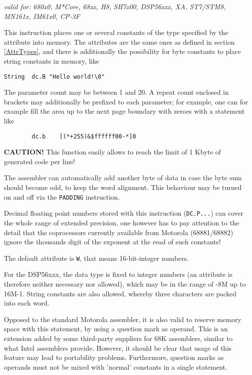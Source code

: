 \documentclass[12pt,twoside]{report}
\newcommand{\bb}[1]{{\bf #1}}
\newcommand{\tty}[1]{{\tt #1}}
\begin{document}
{\em valid for: 680x0, M*Core, 68xx, H8, SH7x00, DSP56xxx, XA,
  ST7/STM8, MN161x, IM61x0, CP-3F}

This instruction places one or several constants of the type
specified by the attribute into memory.  The attributes are the same ones as
defined in section \ref{AttrTypes}, and there is additionally the
possibility for byte constants to place string constants in memory, like
\begin{verbatim}
String  dc.B "Hello world!\0"
\end{verbatim}
The parameter count may be between 1 and 20.  A repeat count enclosed
in brackets may additionally be prefixed to each parameter; for
example, one can for example fill the area up to the next page
boundary with zeroes with a statement like
\begin{verbatim}
        dc.b    [(*+255)&$ffffff00-*]0
\end{verbatim}
\bb{CAUTION!}  This function easily allows to reach the limit of 1 Kbyte
of generated code per line!

The assembler can automatically add another byte of data in case the byte sum
should become odd, to keep the word alignment.  This behaviour may be
turned on and off via the \tty{PADDING} instruction.

Decimal floating point numbers stored with this instruction (\tty{DC.P...})
can cover the whole range of extended precision, one however has to
pay attention to the detail that the coprocessors currently available
from Motorola (68881/68882) ignore the thousands digit of the
exponent at the read of such constants!

The default attribute is \tty{W}, that means 16-bit-integer numbers.

For the DSP56xxx, the data type is fixed to integer numbers (an attribute is
therefore neither necessary nor allowed), which may be in the range
of -8M up to 16M-1.  String constants are also allowed, whereby three characters
are packed into each word.

Opposed to the standard Motorola assembler, it is also valid to reserve
memory space with this statement, by using a question mark as operand.
This is an extension added by some third-party suppliers for 68K
assemblers, similar to what Intel assemblers provide.  However, it should
be clear that usage of this feature may lead to portability problems.
Furthermore, question marks as operands must not be mixed with 'normal'
constants in a single statement.

\end{document}
